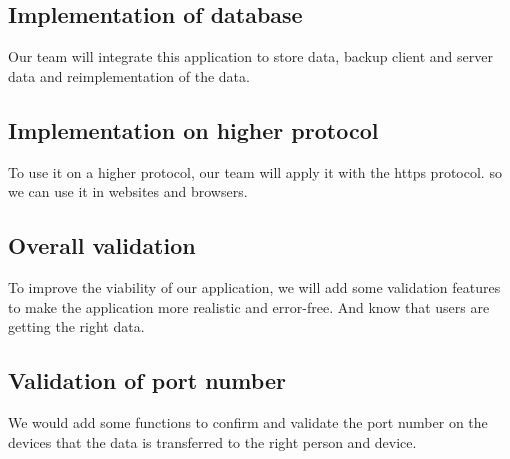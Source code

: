     \subsection{Implementation  of database}\label{subsec:implementation-database}
    Our team will integrate this application to store data, backup client and server data and 
    reimplementation of the data.

    \subsection{Implementation on higher protocol}\label{subsec:implementation-on-higher-protocol}
    To use it on a higher protocol, our team will apply it with the https protocol. 
    so we can use it in websites and browsers.


	\subsection{Overall validation }\label{subsec:validation overall}
	To improve the viability of our application, we will add some validation features
	 to make the application more realistic and error-free.
	And know that users are getting the right data.
	

   \subsection{Validation of port number}\label{subsec:validate of port number}
	We would add some functions to confirm and validate the port number on the devices
	that the data is transferred to the right person and device.
   




